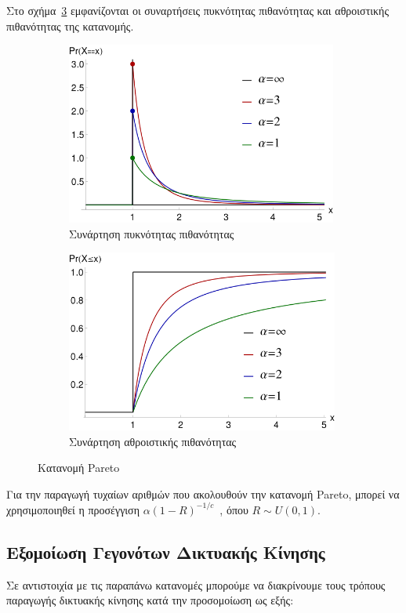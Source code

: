 \documentclass[12pt]{report}
\begin{document}
Στο σχήμα~\ref{fig:Pareto_Dist} εμφανίζονται οι συναρτήσεις πυκνότητας πιθανότητας και αθροιστικής πιθανότητας της κατανομής.
\begin{figure}[h]
\begin{subfigure}{0.5\textwidth}
\includegraphics[width=1.0\linewidth, height=6cm]{par_dist_pmf} 
\caption{Συνάρτηση πυκνότητας πιθανότητας}
\label{fig:Pareto_Dist_PMF}
\end{subfigure}
\begin{subfigure}{0.5\textwidth}
\includegraphics[width=1.0\linewidth, height=6cm]{par_dist_cdf}
\caption{Συνάρτηση αθροιστικής πιθανότητας}
\label{fig:Pareto_Dist_CDF}
\end{subfigure}
 
\caption{Κατανομή \textlatin{Pareto}}
\label{fig:Pareto_Dist}
\end{figure}

Για την παραγωγή τυχαίων αριθμών που ακολουθούν την κατανομή \textlatin{Pareto}, μπορεί να χρησιμοποιηθεί η προσέγγιση \(\alpha(1-R)^{-1/c}\)~\cite{book:07}, όπου \(R \sim U(0, 1)\).

\subsection{Εξομοίωση Γεγονότων Δικτυακής Κίνησης}
Σε αντιστοιχία με τις παραπάνω κατανομές μπορούμε να διακρίνουμε τους τρόπους παραγωγής δικτυακής κίνησης κατά την προσομοίωση ως εξής:
\end{document}
